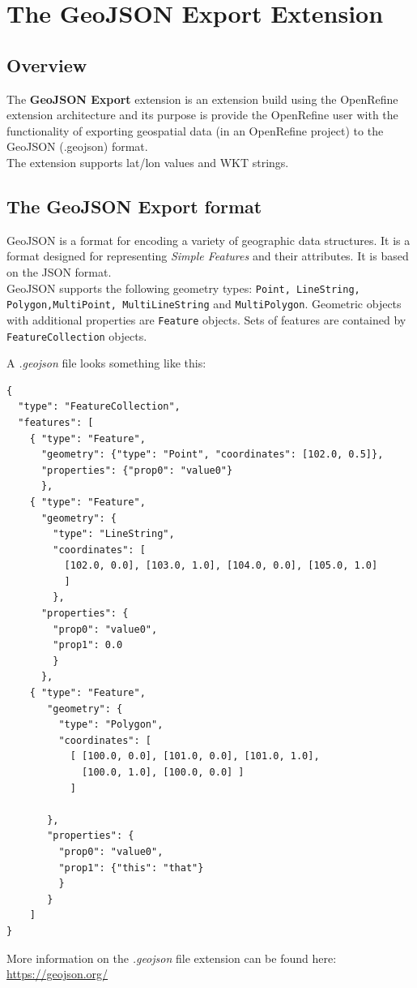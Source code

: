 \chapter{The GeoJSON Export Extension}\label{ch:the-geojson-export-extension}
\section{Overview}
The \textbf{GeoJSON Export} extension is an extension build using the OpenRefine extension architecture and its
purpose is provide the OpenRefine user with the functionality of exporting geospatial data (in an OpenRefine project) to
the GeoJSON (.geojson) format.\\
\newline
The extension supports lat/lon values and WKT strings.
\section{The GeoJSON Export format}
GeoJSON is a format for encoding a variety of geographic data structures.
It is a format designed for representing \textit{Simple Features} and their attributes.
It is based on the JSON format.\\
\newline
GeoJSON supports the following geometry types:
\texttt{Point, LineString, Polygon,MultiPoint, MultiLineString}
and \texttt{MultiPolygon}.
Geometric objects with additional properties are \texttt{Feature} objects.
Sets of features are contained by \texttt{FeatureCollection} objects. \cite{WhatIsGeoJSON}\\
\newline

A \textit{.geojson} file looks something like this:
\begin{verbatim}
{
  "type": "FeatureCollection",
  "features": [
    { "type": "Feature",
      "geometry": {"type": "Point", "coordinates": [102.0, 0.5]},
      "properties": {"prop0": "value0"}
      },
    { "type": "Feature",
      "geometry": {
        "type": "LineString",
        "coordinates": [
          [102.0, 0.0], [103.0, 1.0], [104.0, 0.0], [105.0, 1.0]
          ]
        },
      "properties": {
        "prop0": "value0",
        "prop1": 0.0
        }
      },
    { "type": "Feature",
       "geometry": {
         "type": "Polygon",
         "coordinates": [
           [ [100.0, 0.0], [101.0, 0.0], [101.0, 1.0],
             [100.0, 1.0], [100.0, 0.0] ]
           ]

       },
       "properties": {
         "prop0": "value0",
         "prop1": {"this": "that"}
         }
       }
    ]
}
\end{verbatim}
More information on the \textit{.geojson} file extension can be found here: \href{https://geojson.org/}{https://geojson.org/}
\pagebreak
